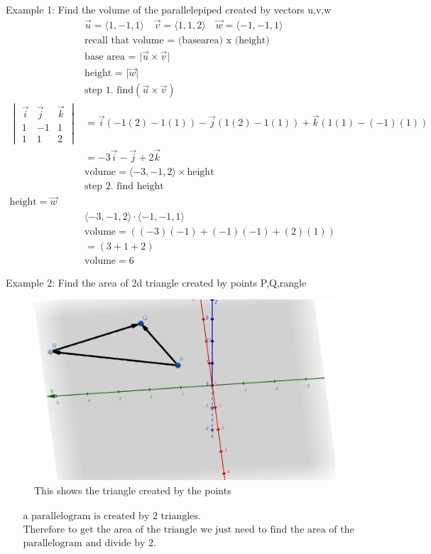 \documentclass{article}
\newcommand{\abs}[1]{\lvert#1\rvert} %
\newcommand{\vecgen}[3]{\langle #1, #2, #3 \rangle} %
\begin{document}
Example 1: Find the volume of the parallelepiped created by vectors u,v,w
\begin{align*}
    &\vec{u} = \vecgen{1}{-1}{1} \quad
    \vec{v} = \vecgen{1}{1}{2} \quad
    \vec{w} = \vecgen{-1}{-1}{1} \\
    &\text{recall that volume = (basearea) x (height)}\\
    &\text{base area = } \abs{\vec{u} \times \vec{v}} \\
    &\text{height = } \abs{\vec{w}} \\
    &\text{step 1. find} (\vec{u} \times \vec{v})\\
    \begin{vmatrix}
        \vec{i} & \vec{j} & \vec{k} \\
        1 & -1 & 1 \\
        1 & 1 & 2
    \end{vmatrix}
    &= \vec{i}(-1(2) - 1(1)) - \vec{j}(1(2) - 1(1)) + \vec{k}(1(1) - (-1)(1)) \\
    &= -3\vec{i} - \vec{j} + 2\vec{k} \\
    &\text{volume} = \vecgen{-3}{-1}{2} \times \text{height}\\
    &\text{step 2. find height}\\
    \text{height} = \vec{w}\\
    &\vecgen{-3}{-1}{2} \cdot \vecgen{-1}{-1}{1}\\
    &\text{volume} = ((-3)(-1)+(-1)(-1)+(2)(1)) \\
    &=(3+1+2)\\
    &\text{volume} = 6
\end{align*}

Example 2: Find the area of 2d triangle created by points P,Q,rangle
\begin{figure}[H]
    \includegraphics[scale=.5,trim=0 0 0 0]{triangle.png} %
    \caption{This shows the triangle created by the points}
\end{figure}

\begin{align*}
    \begin{aligned}
    &\text{a parallelogram is created by 2 triangles.} \\
    &\text{Therefore  to get the area of the triangle we just need to find the area of the}\\
    &\text{parallelogram and divide by 2.}
    \end{aligned}
\end{align*}
\end{document}
